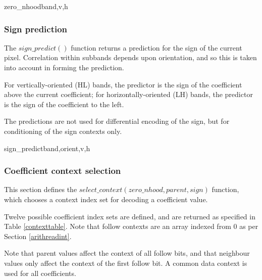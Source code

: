 \begin{pseudo}{zero\_nhood}{band,v,h}
    \bsRET{\false}
  \bsEND
      \bsRET{\false}
    \bsEND
  \bsEND
\bsELSE
      \bsRET{\false}
    \bsEND
  \bsEND
\bsEND
\bsRET{\true}
\end{pseudo}

\subsubsection{Sign prediction}
\label{signpredict}

The $sign\_predict()$ function returns a prediction for the sign of the 
current pixel. Correlation within subbands depends upon orientation,
and so this is taken into account in forming the prediction.

For vertically-oriented (HL) bands, the predictor is the sign of the
coefficient above the current coefficient; for horizontally-oriented (LH)
bands, the predictor is the sign of the coefficient to the left. 

The predictions are not used for differential encoding of the sign, but for
conditioning of the sign contexts only.

\begin{pseudo}{sign\_predict}{band,orient,v,h}
  \bsELSE
  \bsEND
{}
  \bsELSE
  \bsEND
\bsELSE
\bsEND{}
\end{pseudo}

\subsubsection{Coefficient context selection}
\label{selectcoeffcontext}

This section defines the $select\_context(zero\_nhood, parent, sign)$
function, which chooses a context index set for decoding a coefficient value.

Twelve possible coefficient index sets are defined, and are returned as specified 
in Table \ref{contexttable}. Note that follow contexts are an array indexed from $0$
as per Section \ref{arithreadint}.

Note that parent values affect the context of all follow bits, and that neighbour
values only affect the context of the first follow bit. A common data context is used
for all coefficients.

